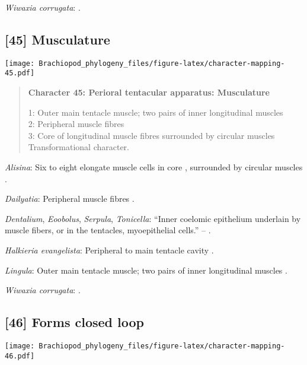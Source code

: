 \documentclass[openany]{book}
\theoremstyle{definition}
\theoremstyle{definition}
\theoremstyle{definition}
\theoremstyle{remark}
\begin{document}
\hypertarget{Wiwaxia_corrugata-coding-44}{}
\emph{Wiwaxia corrugata}: \citet{Temereva2017Thefirst}.

\subsection*{{[}45{]} Musculature}\label{musculature}

\texttt{[image: Brachiopod\_phylogeny\_files/figure-latex/character-mapping-45.pdf]}

\begin{quote}
\textbf{Character 45: Perioral tentacular apparatus: Musculature}

1: Outer main tentacle muscle; two pairs of inner longitudinal muscles\\
2: Peripheral muscle fibres\\
3: Core of longitudinal muscle fibres surrounded by circular muscles\\
Transformational character.
\end{quote}

\hypertarget{Alisina-coding-45}{}
\emph{Alisina}: Six to eight elongate muscle cells in core
\citep{Shimek1988}, surrounded by circular muscles \citep{Byrum1994}.

\hypertarget{Dailyatia-coding-45}{}
\emph{Dailyatia}: Peripheral muscle fibres \citep{Hanson1949}.

\hypertarget{Dentalium-coding-45}{}
\emph{Dentalium}, \emph{Eoobolus}, \emph{Serpula}, \emph{Tonicella}:
``Inner coelomic epithelium underlain by muscle fibers, or in the
tentacles, myoepithelial cells.'' -- \citet{Williams1997Introduction}.

\hypertarget{Halkieria_evangelista-coding-45}{}
\emph{Halkieria evangelista}: Peripheral to main tentacle cavity
\citep{Pilger1982}.

\hypertarget{Lingula-coding-45}{}
\emph{Lingula}: Outer main tentacle muscle; two pairs of inner
longitudinal muscles \citep{Fuchs2006}.

\hypertarget{Wiwaxia_corrugata-coding-45}{}
\emph{Wiwaxia corrugata}: \citep{Pardos1991}.

\subsection*{{[}46{]} Forms closed loop}\label{forms-closed-loop}

\texttt{[image: Brachiopod\_phylogeny\_files/figure-latex/character-mapping-46.pdf]}
\end{document}
